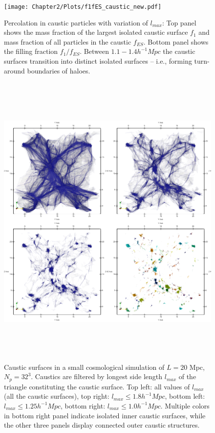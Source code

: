 \begin{figure} 
\centering\texttt{[image: Chapter2/Plots/f1fES\_caustic\_new.pdf]} 
\caption{Percolation in caustic particles with variation of $l_{max}$: Top panel shows the mass fraction of the largest isolated caustic surface $f_1$ and mass fraction of all particles in the caustic $f_{ES}$. Bottom panel shows the filling fraction $f_1/f_{ES}$. Between $1.1-1.4 h^{-1} Mpc$ the caustic surfaces transition into distinct isolated surfaces -- i.e., forming turn-around boundaries of haloes. }
\label{fig:caustic_perc_lmax}
\end{figure}

\begin{figure} 
\centering\includegraphics[height=15cm]{Chapter2/Plots/caustic_connectivity.png} 
\caption{Caustic surfaces in a small cosmological simulation of $L=20$ Mpc, $N_p = 32^3$. Caustics are filtered by longest side length $l_{max}$ of the triangle constituting the caustic surface. Top left: all values of $l_{max}$ (all the caustic surfaces), top right: $ l_{max} \leq 1.8  h^{-1} Mpc$, bottom left: $ l_{max} \leq 1.25  h^{-1} Mpc$, bottom right: $ l_{max} \leq 1.0  h^{-1} Mpc$. Multiple colors in bottom right panel indicate isolated inner caustic surfaces, while the other three panels display connected outer caustic structures.}
\label{fig:caustic_lmax}
\end{figure}

